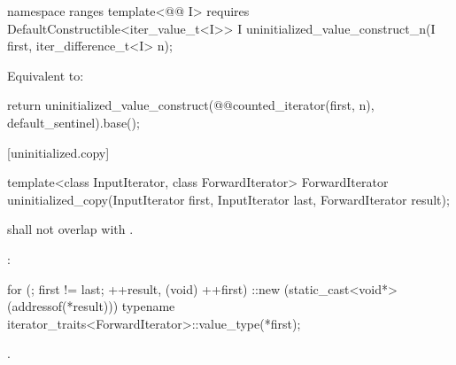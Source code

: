 \begin{addedblock}
%
\begin{itemdecl}
namespace ranges {
  template<@@ I>
      requires DefaultConstructible<iter_value_t<I>>
    I uninitialized_value_construct_n(I first, iter_difference_t<I> n);
}
\end{itemdecl}

\begin{itemdescr}
\pnum
\effects Equivalent to:
\begin{codeblock}
return uninitialized_value_construct(@@counted_iterator(first, n),
                                     default_sentinel{}).base();
\end{codeblock}
\end{itemdescr}
\end{addedblock}

[uninitialized.copy]{}

%
\begin{itemdecl}
template<class InputIterator, class ForwardIterator>
  ForwardIterator uninitialized_copy(InputIterator first, InputIterator last,
                                     ForwardIterator result);
\end{itemdecl}

\begin{itemdescr}
\begin{addedblock}
\pnum
\expects
{} shall not overlap with .
\end{addedblock}

\pnum
\effects
{}:
\begin{codeblock}
for (; first != last; ++result, (void) ++first)
  ::new (static_cast<void*>(addressof(*result)))
    typename iterator_traits<ForwardIterator>::value_type(*first);
\end{codeblock}

\pnum
\returns
{}.
\end{itemdescr}


